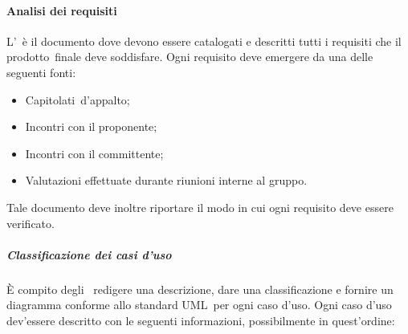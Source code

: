 \documentclass[../NormeProgetto.tex]{subfiles}
\begin{document}
			\paragraph{Analisi dei requisiti}
			L'\analisideirequisiti\ è il documento dove devono essere catalogati e descritti tutti i requisiti che il prodotto\g\ finale deve soddisfare. Ogni requisito deve emergere da una delle seguenti fonti:
			\begin{itemize}
				\item Capitolati\g\ d'appalto;
				\item Incontri con il proponente;
				\item Incontri con il committente;
				\item Valutazioni effettuate durante riunioni interne al gruppo.
			\end{itemize}
			Tale documento deve inoltre riportare il modo in cui ogni requisito deve essere verificato.
				\subparagraph{Classificazione dei casi d'uso}
				È compito degli \analisti\ redigere una descrizione, dare una classificazione e fornire un diagramma conforme allo standard UML\g\ per ogni caso d'uso. Ogni caso d'uso dev'essere descritto con le seguenti informazioni, possibilmente in quest'ordine:
\end{document}
